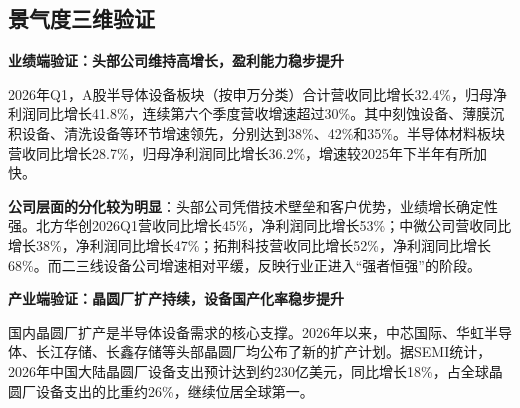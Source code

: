 \subsection{景气度三维验证}

\textbf{业绩端验证：头部公司维持高增长，盈利能力稳步提升}

2026年Q1，A股半导体设备板块（按申万分类）合计营收同比增长32.4\%，归母净利润同比增长41.8\%，连续第六个季度营收增速超过30\%。其中刻蚀设备、薄膜沉积设备、清洗设备等环节增速领先，分别达到38\%、42\%和35\%。半导体材料板块营收同比增长28.7\%，归母净利润同比增长36.2\%，增速较2025年下半年有所加快。

\textbf{公司层面的分化较为明显}：头部公司凭借技术壁垒和客户优势，业绩增长确定性强。北方华创2026Q1营收同比增长45\%，净利润同比增长53\%；中微公司营收同比增长38\%，净利润同比增长47\%；拓荆科技营收同比增长52\%，净利润同比增长68\%。而二三线设备公司增速相对平缓，反映行业正进入“强者恒强”的阶段。

\textbf{产业端验证：晶圆厂扩产持续，设备国产化率稳步提升}

国内晶圆厂扩产是半导体设备需求的核心支撑。2026年以来，中芯国际、华虹半导体、长江存储、长鑫存储等头部晶圆厂均公布了新的扩产计划。据SEMI统计，2026年中国大陆晶圆厂设备支出预计达到约230亿美元，同比增长18\%，占全球晶圆厂设备支出的比重约26\%，继续位居全球第一。

